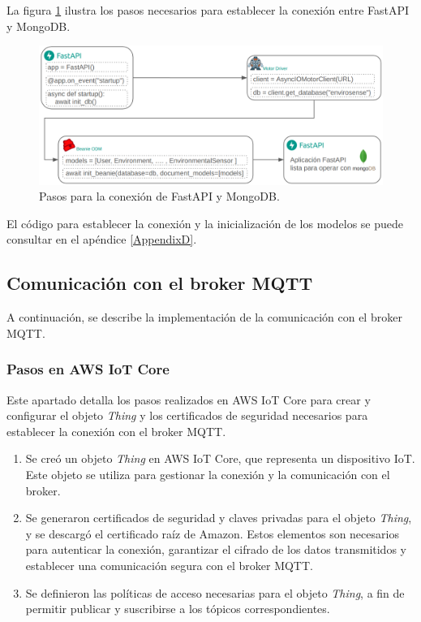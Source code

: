 La figura \ref{fig:conexion mongo} ilustra los pasos necesarios para establecer
la conexión entre FastAPI y MongoDB.

\begin{figure}[H]
    \centering
    \includegraphics[width=.85\textwidth]{./Images/19.png}
    \caption{Pasos para la conexión de FastAPI y MongoDB.}
    \label{fig:conexion mongo}
\end{figure}

El código para establecer la conexión y la inicialización de los modelos se
puede consultar en el apéndice \ref{AppendixD}.

\subsection{Comunicación con el broker MQTT}

A continuación, se describe la implementación de la comunicación con el broker
MQTT.

\subsubsection{Pasos en AWS IoT Core}

Este apartado detalla los pasos realizados en AWS IoT Core para crear y
configurar el objeto \textit{Thing} y los certificados de seguridad necesarios
para establecer la conexión con el broker MQTT.

\begin{enumerate}
    \item Se creó un objeto \textit{Thing} en AWS IoT Core, que representa un dispositivo
          IoT. Este objeto se utiliza para gestionar la conexión y la comunicación con el
          broker.
    \item Se generaron certificados de seguridad y claves privadas para el objeto
          \textit{Thing}, y se descargó el certificado raíz de Amazon. Estos elementos
          son necesarios para autenticar la conexión, garantizar el cifrado de los datos
          transmitidos y establecer una comunicación segura con el broker MQTT.
    \item Se definieron las políticas de acceso necesarias para el objeto \textit{Thing},
          a fin de permitir publicar y suscribirse a los tópicos correspondientes.
\end{enumerate}


